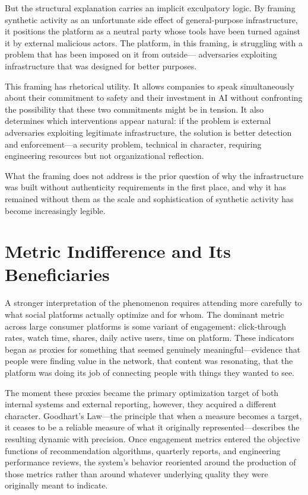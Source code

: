 \documentclass[12pt,a4paper]{article}
\begin{document}
But the structural explanation carries an implicit exculpatory logic. By framing synthetic
activity as an unfortunate side effect of general-purpose infrastructure, it positions the platform
as a neutral party whose tools have been turned against it by external malicious actors. The
platform, in this framing, is struggling with a problem that has been imposed on it from outside---
adversaries exploiting infrastructure that was designed for better purposes.

This framing has rhetorical utility. It allows companies to speak simultaneously about their
commitment to safety and their investment in AI without confronting the possibility that these
two commitments might be in tension. It also determines which interventions appear natural: if
the problem is external adversaries exploiting legitimate infrastructure, the solution is better
detection and enforcement---a security problem, technical in character, requiring engineering
resources but not organizational reflection.

What the framing does not address is the prior question of why the infrastructure was built
without authenticity requirements in the first place, and why it has remained without them as
the scale and sophistication of synthetic activity has become increasingly legible.

\section{Metric Indifference and Its Beneficiaries}

A stronger interpretation of the phenomenon requires attending more carefully to what social
platforms actually optimize and for whom. The dominant metric across large consumer platforms
is some variant of engagement: click-through rates, watch time, shares, daily active users,
time on platform. These indicators began as proxies for something that seemed genuinely
meaningful---evidence that people were finding value in the network, that content was
resonating, that the platform was doing its job of connecting people with things they wanted
to see.

The moment these proxies became the primary optimization target of both internal systems and
external reporting, however, they acquired a different character. Goodhart's Law---the principle
that when a measure becomes a target, it ceases to be a reliable measure of what it originally
represented---describes the resulting dynamic with precision. Once engagement metrics entered
the objective functions of recommendation algorithms, quarterly reports, and engineering
performance reviews, the system's behavior reoriented around the production of those metrics
rather than around whatever underlying quality they were originally meant to indicate.
\end{document}
